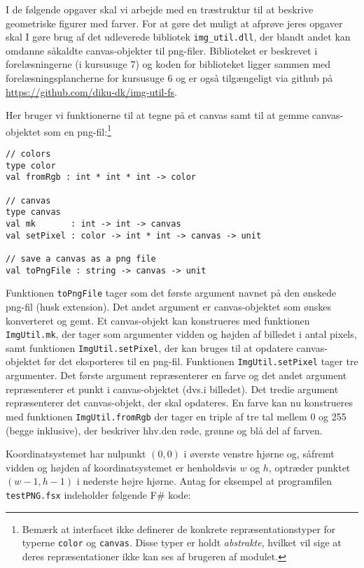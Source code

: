 I de følgende opgaver skal vi arbejde med en træstruktur til at beskrive geometriske
figurer med farver.  For at gøre det muligt at afprøve jeres opgaver
skal I gøre brug af det udleverede bibliotek \texttt{img\_util.dll}, der
blandt andet kan omdanne såkaldte canvas-objekter til png-filer.  Biblioteket er
beskrevet i forelæsningerne (i kursusuge 7) og koden for biblioteket ligger
sammen med forelæsningsplancherne for kursusuge 6 og er også tilgængeligt via github på \url{https://github.com/diku-dk/img-util-fs}.

Her bruger vi funktionerne til at tegne på et canvas samt til at gemme
canvas-objektet som en png-fil:\footnote{Bemærk at interfacet ikke
definerer de konkrete repræsentationstyper for
typerne \lstinline{color} og \lstinline{canvas}. Disse typer er
holdt \emph{abstrakte}, hvilket vil sige at deres repræsentationer
ikke kan ses af brugeren af modulet.}

\begin{lstlisting}[numbers=none,frame=none,mathescape]
// colors
type color
val fromRgb : int * int * int -> color

// canvas
type canvas
val mk       : int -> int -> canvas
val setPixel : color -> int * int -> canvas -> unit

// save a canvas as a png file
val toPngFile : string -> canvas -> unit
\end{lstlisting}

Funktionen \lstinline{toPngFile} tager som det første argument navnet
på den ønskede png-fil (husk extension).  Det andet argument er
canvas-objektet som ønskes konverteret og gemt. Et canvas-objekt kan
konstrueres med funktionen \lstinline{ImgUtil.mk}, der tager som
argumenter vidden og højden af billedet i antal pixels, samt funktionen
\lstinline{ImgUtil.setPixel}, der kan bruges til at opdatere canvas-objektet
før det eksporteres til en png-fil. Funktionen \lstinline{ImgUtil.setPixel}
tager tre argumenter. Det første argument repræsenterer en farve og
det andet argument repræsenterer et punkt i canvas-objektet (dvs.\@ i
billedet). Det tredie argument repræsenterer det canvas-objekt, der
skal opdateres.  En farve kan nu konstrueres med funktionen
\lstinline{ImgUtil.fromRgb} der tager en triple af tre tal mellem 0 og
255 (begge inklusive), der beskriver hhv.\@ den røde, grønne og blå del
af farven.

Koordinatsystemet har nulpunkt $(0,0)$ i øverste venstre hjørne og,
såfremt vidden og højden af koordinatsystemet er henholdsvis $w$ og
$h$, optræder punktet $(w-1,h-1)$ i nederste højre hjørne.  Antag for
eksempel at programfilen \texttt{testPNG.fsx} indeholder følgende F\#
kode:

